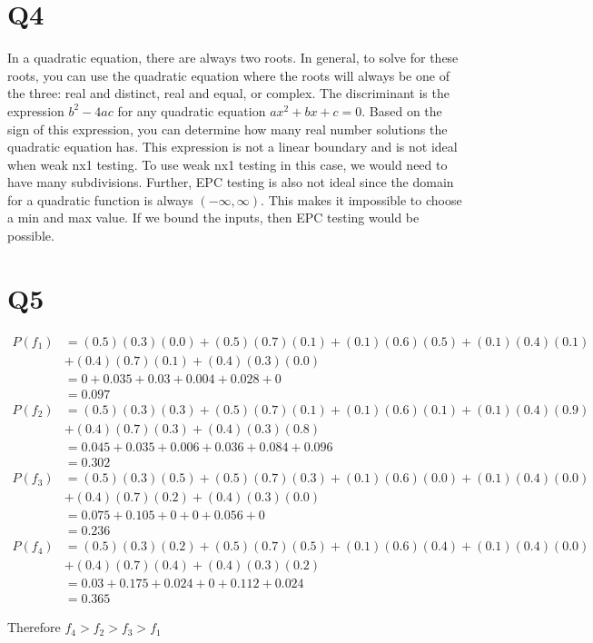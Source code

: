 \documentclass[12pt, letterpaper, titlepage]{article}
\begin{document}
\section{Q4}
In a quadratic equation, there are always two roots. In general, to solve for these roots, you can use the quadratic equation where the roots will always be one of the three: real and distinct, real and equal, or complex. The discriminant is the expression $b^2 - 4ac$ for any quadratic equation $ax^2+bx+c =0$. Based on the sign of this expression, you can determine how many real number solutions the quadratic equation has. This expression is not a linear boundary and is not ideal when weak nx1 testing. To use weak nx1 testing in this case, we would need to have many subdivisions. Further, EPC testing is also not ideal since the domain for a quadratic function is always $(-\infty, \infty)$. This makes it impossible to choose a min and max value. If we bound the inputs, then EPC testing would be possible.
\section{Q5}
\begin{align}
    P(f_1) &= (0. 5)(0. 3)(0. 0) + (0. 5)(0. 7)(0. 1) + (0. 1)(0. 6)(0. 5) + (0. 1)(0. 4)(0. 1) \\&+ (0. 4)(0. 7)(0. 1) + (0.4)(0.3)(0.0) \\
           &= 0 + 0. 035 + 0. 03 + 0. 004 + 0. 028 + 0 \\
           &= 0.097
\end{align}
\begin{align}
    P(f_2) &=  (0. 5)(0. 3)(0. 3) + (0. 5)(0. 7)(0. 1) + (0. 1)(0. 6)(0. 1) + (0. 1)(0. 4)(0. 9)  \\&+ (0. 4)(0. 7)(0. 3) + (0.4)(0.3)(0.8) \\
           &=  0. 045 + 0. 035 + 0. 006 + 0. 036 + 0. 084 + 0. 096 \\
           &= 0. 302
\end{align}
\begin{align}
    P(f_3) &= (0. 5)(0. 3)(0. 5) + (0. 5)(0. 7)(0. 3) + (0. 1)(0. 6)(0. 0) + (0. 1)(0. 4)(0. 0)  \\&+  (0. 4)(0. 7)(0. 2) + (0. 4)(0.3)(0.0) \\
           &=  0. 075 + 0. 105 + 0 + 0 + 0. 056 + 0 \\
           &= 0.236
\end{align}
\begin{align}
    P(f_4) &= (0. 5)(0. 3)(0. 2) + (0. 5)(0. 7)(0. 5) + (0. 1)(0. 6)(0. 4) + (0. 1)(0. 4)(0. 0)  \\&+  (0. 4)(0. 7)(0. 4) + (0. 4)(0.3)(0.2) \\
           &=  0. 03 + 0. 175 + 0. 024 + 0 + 0. 112 + 0. 024 \\
           &= 0.365
\end{align}

Therefore $f_4 > f_2 > f_3 > f_1$
\end{document}
